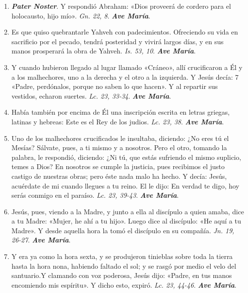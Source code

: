 \documentclass[11pt,a4paper]{book}
\begin{document}
    \begin{enumerate}
    
        \item \textbf{\emph{Pater Noster}}. Y respondió Abraham: «Dios proveerá de cordero para el holocausto, hijo mío». \emph{Gn. 22, 8}. \textbf{\emph{Ave María}}.
        
        \item Es que quiso quebrantarle Yahveh con padecimientos. Ofreciendo su vida en sacrificio por el pecado, tendrá posteridad y vivirá largos días, y en sus manos
            prosperará la obra de Yahveh. \emph{Is. 53, 10}. \textbf{\emph{Ave María}}.

        \item Y cuando hubieron llegado al lugar llamado «Cráneo», allí crucificaron a Él y a los malhechores, uno a la derecha y el otro a la izquierda. Y Jesús decía: 7
            «Padre, perdónalos, porque no saben lo que hacen». Y al repartir sus vestidos, echaron suertes. \emph{Lc. 23, 33-34}. \textbf{\emph{Ave María}}.

        \item Había también por encima de Él una inscripción escrita en letras griegas, latinas y hebreas: Este es el Rey de los judios. \emph{Lc. 23, 38}. \textbf{\emph{Ave María}}.

        \item Uno de los malhechores crucificados le insultaba, diciendo: ¿No eres tú el Mesías? Sálvate, pues, a ti mismo y a nosotros. Pero el otro,
            tomando la palabra, le respondió, diciendo: ¿Ni tú, que estás sufriendo el mismo suplicio, temes a Dios? En nosotros se cumple la justicia, pues
            recibimos el justo castigo de nuestras obras; pero éste nada malo ha hecho. Y decía: Jesús, acuérdate de mi cuando llegues a tu reino. El le dijo: En verdad te digo, 
            hoy serás conmigo en el paraíso. \emph{Lc. 23, 39-43}. \textbf{\emph{Ave María}}.

        \item Jesús, pues, viendo a la Madre, y junto a ella al discípulo a quien amaba, dice a tu Madre: «Mujer, he ahí a tu hijo». 
            Luego dice al discípulo: «He aquí a tu Madre». Y desde aquella hora la tomó el discípulo en su compañía. \emph{Jn. 19, 26-27}. \textbf{\emph{Ave María}}.

        \item Y era ya como la hora sexta, y se produjeron tinieblas sobre toda la tierra hasta la hora nona, habiendo faltado el sol; 
            y se rasgó por medio el velo del santuario.Y clamando con voz poderosa, Jesús dijo: «Padre, en tus manos encomiendo mis espíritu». Y dicho esto, expiró. 
            \emph{Lc. 23, 44-46}. \textbf{\emph{Ave María}}.


\end{enumerate}
\end{document}
